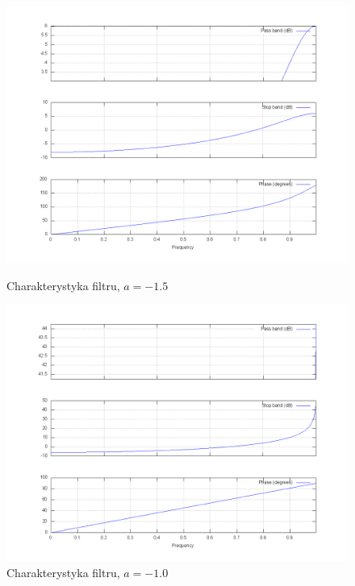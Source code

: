 \documentclass[wide,a4paper,titlepage,12pt]{mwart}
\begin{document}
  \begin{figure}[htbp]
    \begin{center}
      \includegraphics[scale=.3]{out/fig9.png}
      \caption{\label{fig9} Charakterystyka filtru, $a=-1.5$}
      \includegraphics[scale=.3]{out/fig10.png}
      \caption{\label{fig10} Charakterystyka filtru, $a=-1.0$}

    \end{center}
  \end{figure}
\end{document}
